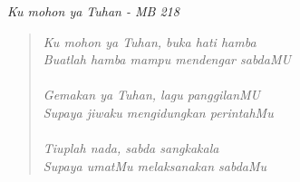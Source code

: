 \small
\begin{center}
\itshape{Ku mohon ya Tuhan - MB 218}
\end{center}
\begin{verse}
\itshape{
Ku mohon ya Tuhan, 
buka hati hamba\\
Buatlah hamba 
mampu mendengar sabdaMU\\
{~}\\
Gemakan ya Tuhan, 
lagu panggilanMU\\
Supaya jiwaku 
mengidungkan perintahMu\\
{~}\\
Tiuplah nada, 
sabda sangkakala\\
Supaya umatMu
melaksanakan sabdaMu}
\end{verse}
\normalsize



